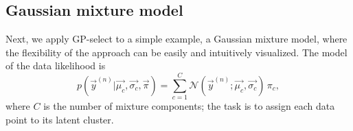 \subsection{Gaussian mixture model}
%
Next, we apply GP-select to a simple example, a Gaussian mixture model, where the flexibility of the approach can be easily and intuitively visualized.
The model of the data likelihood is
%
\vspace{-.2cm}
\begin{equation}\label{eq:mog}
p(\vec{y}^{(n)} | \vec{\mu_c}, \vec{\sigma_c}, \vec{\pi}) = \sum_{c=1}^{C} \mathcal{N}(\vec{y}^{(n)}; \vec{\mu_c}, \vec{\sigma_c}) \, \pi_c,
\end{equation}
%
where $C$ is the number of mixture components; the task is to assign each data point to its latent cluster.
%

